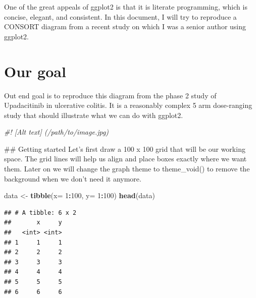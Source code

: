 \documentclass[
]{book}
\newenvironment{Shaded}{\begin{snugshade}}{\end{snugshade}}
\newcommand{\CommentTok}[1]{\textcolor[rgb]{0.56,0.35,0.01}{\textit{#1}}}
\newcommand{\DataTypeTok}[1]{\textcolor[rgb]{0.13,0.29,0.53}{#1}}
\newcommand{\DecValTok}[1]{\textcolor[rgb]{0.00,0.00,0.81}{#1}}
\newcommand{\KeywordTok}[1]{\textcolor[rgb]{0.13,0.29,0.53}{\textbf{#1}}}
\newcommand{\NormalTok}[1]{#1}
\newcommand{\OperatorTok}[1]{\textcolor[rgb]{0.81,0.36,0.00}{\textbf{#1}}}
\newcommand{\StringTok}[1]{\textcolor[rgb]{0.31,0.60,0.02}{#1}}
\begin{document}
One of the great appeals of ggplot2 is that it is literate programming, which is concise, elegant, and consistent. In this document, I will try to reproduce a CONSORT diagram from a recent study on which I was a senior author using ggplot2.

\hypertarget{our-goal}{%
\section{Our goal}\label{our-goal}}

Out end goal is to reproduce this diagram from the phase 2 study of Upadacitinib in ulcerative colitis. It is a reasonably complex 5 arm dose-ranging study that should illustrate what we can do with ggplot2.

\begin{Shaded}
\begin{Highlighting}[]
\CommentTok{#! [Alt text] (/path/to/image.jpg)}
\end{Highlighting}
\end{Shaded}

\#\# Getting started
Let's first draw a 100 x 100 grid that will be our working space.
The grid lines will help us align and place boxes exactly where we want them. Later on we will change the graph theme to theme\_void() to remove the background when we don't need it anymore.

\begin{Shaded}
\begin{Highlighting}[]
\NormalTok{data <-}\StringTok{ }\KeywordTok{tibble}\NormalTok{(}\DataTypeTok{x=} \DecValTok{1}\OperatorTok{:}\DecValTok{100}\NormalTok{, }\DataTypeTok{y=} \DecValTok{1}\OperatorTok{:}\DecValTok{100}\NormalTok{)}
\KeywordTok{head}\NormalTok{(data)}
\end{Highlighting}
\end{Shaded}

\begin{verbatim}
## # A tibble: 6 x 2
##       x     y
##   <int> <int>
## 1     1     1
## 2     2     2
## 3     3     3
## 4     4     4
## 5     5     5
## 6     6     6
\end{verbatim}

\begin{Shaded}
\end{Shaded}
\end{document}
